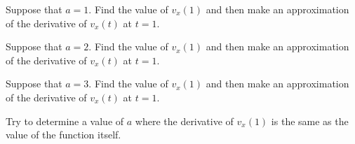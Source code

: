 \begin{problem}
  \begin{subproblem}
  \item Suppose that $a=1$. Find the value of $v_x(1)$ and then make
    an approximation of the derivative of $v_x(t)$ at $t=1$.  
    \vfill
    \item Suppose that $a=2$. Find the value of $v_x(1)$ and then make
    an approximation of the derivative of $v_x(t)$ at $t=1$.  
    \vfill
    \item Suppose that $a=3$. Find the value of $v_x(1)$ and then make
    an approximation of the derivative of $v_x(t)$ at $t=1$.  
    \vfill
    \item Try to determine a value of $a$ where the derivative of
      $v_x(1)$ is the same as the value of the function itself.
      \vfill
  \end{subproblem}


\end{problem}

